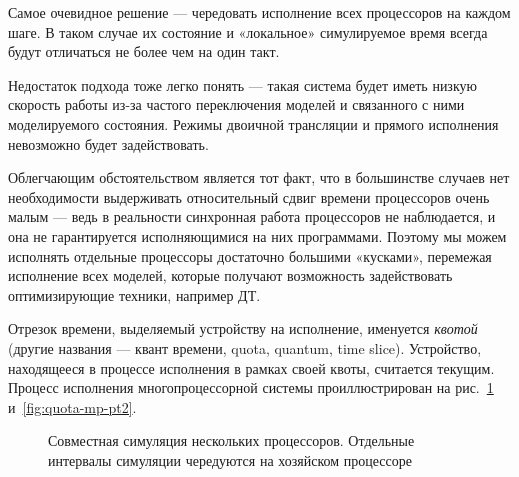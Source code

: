 Самое очевидное решение --- чередовать исполнение всех процессоров на каждом  шаге. В таком случае их состояние и «локальное» симулируемое время всегда будут отличаться не более чем на один такт.

Недостаток подхода тоже легко понять --- такая система будет иметь низкую скорость работы из-за частого переключения моделей и связанного с ними моделируемого состояния. Режимы двоичной трансляции и прямого исполнения невозможно будет задействовать.

Облегчающим обстоятельством является тот факт, что в большинстве случаев нет необходимости выдерживать относительный сдвиг времени процессоров очень малым --- ведь в реальности синхронная работа процессоров не наблюдается, и она не гарантируется исполняющимися на них программами. Поэтому мы можем исполнять отдельные процессоры достаточно большими «кусками», перемежая исполнение всех моделей, которые получают возможность задействовать оптимизирующие техники, например ДТ. 

Отрезок времени, выделяемый устройству на исполнение, именуется \textit{квотой} (другие названия --- квант времени, quota, quantum, time slice). Устройство, находящееся в процессе исполнения в рамках своей квоты, считается текущим. Процесс исполнения многопроцессорной системы проиллюстрирован на рис.~\ref{fig:quota-mp-pt1} и~\ref{fig:quota-mp-pt2}.

\begin{figure}[htb]
    \centering
    \caption[Совместная симуляция нескольких процессоров, часть 1]{Совместная симуляция нескольких процессоров. Отдельные интервалы симуляции чередуются на хозяйском процессоре}
    \label{fig:quota-mp-pt1}
\end{figure}

